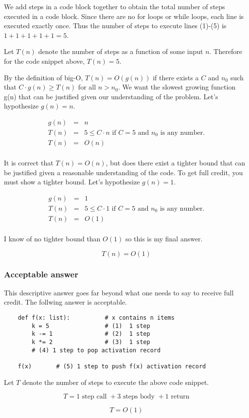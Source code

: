 \documentclass{article}
\begin{document}
We add steps in a code block together to obtain the total number of
steps executed in a code block.  Since there are no for loops or
while loops, each line is executed exactly once.  Thus the number of
steps to execute lines (1)-(5) is $1 + 1 + 1 + 1 + 1=5$.

Let $T(n)$ denote the number of steps as a function of some input $n$.
Therefore for the code snippet above, $T(n)=5$.

By the definition of big-O, $T(n)=O(g(n))$ if there exists a $C$ and
$n_0$ such that $C\cdot g(n) \geq T(n)$ for all $n > n_0$.  We want the
slowest growing function g(n) that can be justified given our
understanding of the problem.  Let's hypothesize $g(n) = n$.

\begin{eqnarray*}
  g(n) &=& n \\
  T(n) &=& 5 \leq C \cdot n \text{ if $C = 5$ and $n_0$ is any number.} \\
  T(n) &=& O(n) \\
\end{eqnarray*}

It is correct that $T(n) = O(n)$, but does there exist a tighter bound
that can be justified given a reasonable understanding of the code.
To get full credit, you must show a tighter bound.
Let's hypothesize $g(n)=1$.

\begin{eqnarray*}
  g(n) &=& 1 \\
  T(n) &=& 5 \leq C \cdot 1 \text{ if $C = 5$ and $n_0$ is any number.} \\
  T(n) &=& O(1) \\
\end{eqnarray*}

I know of no tighter bound than $O(1)$ so this is my final answer.

\[
  \boxed{T(n) = O(1)}
\]

\subsubsection{Acceptable answer}

This descriptive answer goes far beyond what one needs to say to receive
full credit.  The follwing answer is acceptable.

\begin{graybox}
  \begin{verbatim}
    def f(x: list):          # x contains n items
        k = 5                # (1)  1 step
        k -= 1               # (2)  1 step
        k *= 2               # (3)  1 step
        # (4) 1 step to pop activation record
    
    f(x)       # (5) 1 step to push f(x) activation record
  \end{verbatim}

  Let $T$ denote the number of steps to execute the above code snippet.

  \[
    T = 1 \text{ step call } + 3 \text{ steps body } + 1 \text{ return}
  \]
    
  \[
  \boxed{T = O(1)}
  \]
  
\end{graybox}
\end{document}
